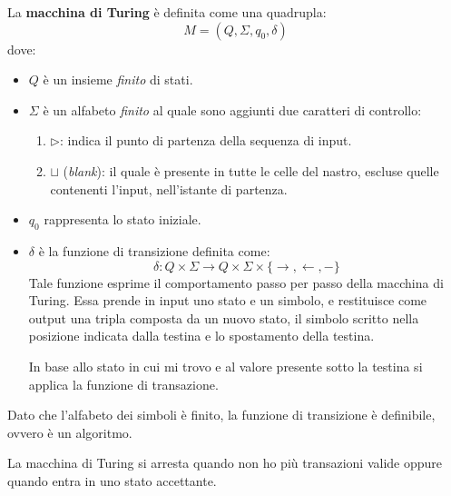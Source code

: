 \begin{definizione}
    La \textbf{macchina di Turing} è definita come una quadrupla:
    \begin{equation}
        M = (Q, \Sigma, q_0, \delta)
    \end{equation}
    dove:
    \begin{itemize}
        \item $Q$ è un insieme \textit{finito} di stati.
        \item $\Sigma$ è un alfabeto \textit{finito} al quale sono aggiunti due
              caratteri di controllo:
              \begin{enumerate}
                  \item $\triangleright$: indica il punto di partenza della
                        sequenza di input.
                  \item $\sqcup$ (\textit{blank}): il quale è presente in tutte
                        le celle del nastro, escluse quelle contenenti l'input,
                        nell'istante di partenza.
              \end{enumerate}
        \item $q_0$ rappresenta lo stato iniziale.
        \item $\delta$ è la funzione di transizione definita come:
              \begin{equation}
                  \delta: Q \times \Sigma \longrightarrow Q \times \Sigma \times
                  \{\rightarrow, \leftarrow, -\}
              \end{equation}
              Tale funzione esprime il comportamento passo per passo della
              macchina di Turing. Essa prende in input uno stato e un simbolo,
              e restituisce come output una tripla composta da un nuovo stato,
              il simbolo scritto nella posizione indicata dalla testina e lo
              spostamento della testina.

              In base allo stato in cui mi trovo e al valore presente sotto la
              testina si applica la funzione di transazione.
    \end{itemize}
\end{definizione}
\begin{osservazione}
    Dato che l'alfabeto dei simboli è finito, la funzione di transizione è
    definibile, ovvero è un algoritmo.
\end{osservazione}
La macchina di Turing si arresta quando non ho più transazioni valide oppure
quando entra in uno stato accettante.

